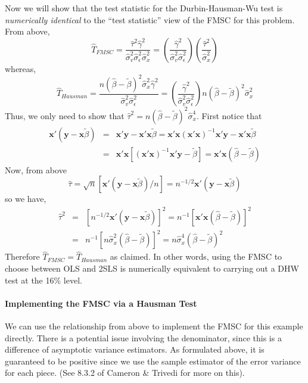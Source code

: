 \documentclass[12pt]{article}
\theoremstyle{definition}
\begin{document}
Now we will show that the test statistic for the Durbin-Hausman-Wu test is \emph{numerically identical} to the ``test statistic'' view of the FMSC for this problem. From above,
  $$\widehat{T}_{FMSC} = \frac{\widehat{\tau}^2 \widehat{\gamma}^2}{\widehat{\sigma}_v^2 \widehat{\sigma}_\epsilon^2 \widehat{\sigma}_x^2} = \left(\frac{ \widehat{\gamma}^2}{\widehat{\sigma}_v^2 \widehat{\sigma}_\epsilon^2}\right)\left(\frac{\widehat{\tau}^2}{\widehat{\sigma}_x^2}\right)$$
whereas,
  $$\widehat{T}_{Hausman} = \frac{n(\widehat{\beta} - \widetilde{\beta})^2 \widehat{\sigma}_x^2 \widehat{\gamma}^2}{\widehat{\sigma}_v^2 \widehat{\sigma}_\epsilon^2} = \left(\frac{ \widehat{\gamma}^2}{\widehat{\sigma}_v^2 \widehat{\sigma}_\epsilon^2}\right)n(\widehat{\beta} - \widetilde{\beta})^2 \widehat{\sigma}_x^2$$
  Thus, we only need to show that $\widehat{\tau}^2 = n(\widehat{\beta} - \widetilde{\beta})^2 \widehat{\sigma}_x^4$. First notice that
\begin{eqnarray*}
   \mathbf{x}' \left(\mathbf{y} - \mathbf{x}\widetilde{\beta}\right)&=& \mathbf{x}'\mathbf{y} - \mathbf{x}'\mathbf{x}\widetilde{\beta} =\mathbf{x}'\mathbf{x}\left(\mathbf{x}'\mathbf{x}\right)^{-1} \mathbf{x}'\mathbf{y} - \mathbf{x}'\mathbf{x}\widetilde{\beta}\\
    &=&\mathbf{x}'\mathbf{x}\left[\left(\mathbf{x}'\mathbf{x}\right)^{-1} \mathbf{x}'\mathbf{y} -  \widetilde{\beta}\right] = \mathbf{x}'\mathbf{x} \left( \widehat{\beta} - \widetilde{\beta}\right)
\end{eqnarray*}
Now, from above
  $$\widehat{\tau} = \sqrt{n} \left[\mathbf{x}'(\mathbf{y} - \mathbf{x}\widetilde{\beta})/n\right] = n^{-1/2} \textbf{x}'(\mathbf{y} - \mathbf{x}\widetilde{\beta})$$
so we have,
  \begin{eqnarray*}
    \widehat{\tau}^2 &=&  \left[n^{-1/2} \textbf{x}'(\mathbf{y} - \mathbf{x}\widetilde{\beta})\right]^2 = n^{-1}\left[\mathbf{x}'\mathbf{x} \left( \widehat{\beta} - \widetilde{\beta}\right) \right]^2 \\
      &=& n^{-1}\left[n \widehat{\sigma}_x^2 \left( \widehat{\beta} - \widetilde{\beta}\right) \right]^2  = n\widehat{\sigma}_x^4 \left( \widehat{\beta} - \widetilde{\beta}\right) ^2
  \end{eqnarray*}
  Therefore $\widehat{T}_{FMSC} = \widehat{T}_{Hausman}$ as claimed. In other words, using the FMSC to choose between OLS and 2SLS is numerically equivalent to carrying out a DHW test at the 16\% level.


\paragraph{Implementing the FMSC via a Hausman Test}
We can use the relationship from above to implement the FMSC for this example directly. There is a potential issue involving the denominator, since this is a difference of asymptotic variance estimators. As formulated above, it is guaranteed to be positive since we use the sample estimator of the error variance for each piece. (See 8.3.2 of Cameron \& Trivedi for more on this). 
\end{document}
